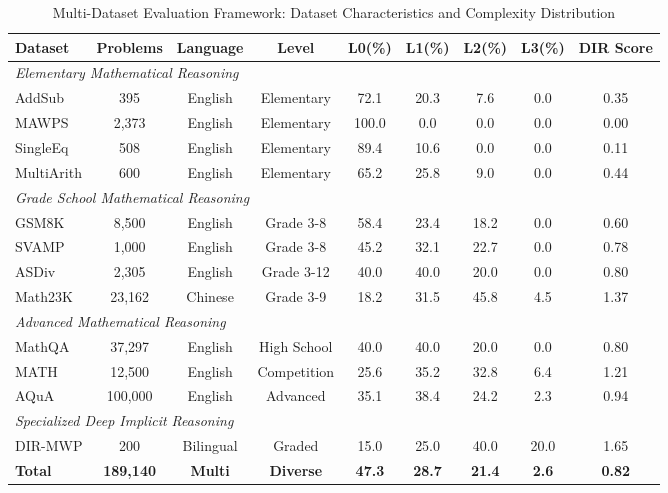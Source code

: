 \begin{table*}[htbp]
\caption{Multi-Dataset Evaluation Framework: Dataset Characteristics and Complexity Distribution}
\label{tab:dataset_framework}
\centering
\small
\begin{tabular}{lcccccccc}
\toprule
\textbf{Dataset} & \textbf{Problems} & \textbf{Language} & \textbf{Level} & \textbf{L0(\%)} & \textbf{L1(\%)} & \textbf{L2(\%)} & \textbf{L3(\%)} & \textbf{DIR Score} \\
\midrule
\multicolumn{9}{l}{\textit{Elementary Mathematical Reasoning}} \\
AddSub & 395 & English & Elementary & 72.1 & 20.3 & 7.6 & 0.0 & 0.35 \\
MAWPS & 2,373 & English & Elementary & 100.0 & 0.0 & 0.0 & 0.0 & 0.00 \\
SingleEq & 508 & English & Elementary & 89.4 & 10.6 & 0.0 & 0.0 & 0.11 \\
MultiArith & 600 & English & Elementary & 65.2 & 25.8 & 9.0 & 0.0 & 0.44 \\
\midrule
\multicolumn{9}{l}{\textit{Grade School Mathematical Reasoning}} \\
GSM8K & 8,500 & English & Grade 3-8 & 58.4 & 23.4 & 18.2 & 0.0 & 0.60 \\
SVAMP & 1,000 & English & Grade 3-8 & 45.2 & 32.1 & 22.7 & 0.0 & 0.78 \\
ASDiv & 2,305 & English & Grade 3-12 & 40.0 & 40.0 & 20.0 & 0.0 & 0.80 \\
Math23K & 23,162 & Chinese & Grade 3-9 & 18.2 & 31.5 & 45.8 & 4.5 & 1.37 \\
\midrule
\multicolumn{9}{l}{\textit{Advanced Mathematical Reasoning}} \\
MathQA & 37,297 & English & High School & 40.0 & 40.0 & 20.0 & 0.0 & 0.80 \\
MATH & 12,500 & English & Competition & 25.6 & 35.2 & 32.8 & 6.4 & 1.21 \\
AQuA & 100,000 & English & Advanced & 35.1 & 38.4 & 24.2 & 2.3 & 0.94 \\
\midrule
\multicolumn{9}{l}{\textit{Specialized Deep Implicit Reasoning}} \\
DIR-MWP & 200 & Bilingual & Graded & 15.0 & 25.0 & 40.0 & 20.0 & 1.65 \\
\midrule
\textbf{Total} & \textbf{189,140} & \textbf{Multi} & \textbf{Diverse} & \textbf{47.3} & \textbf{28.7} & \textbf{21.4} & \textbf{2.6} & \textbf{0.82} \\
\bottomrule
\end{tabular}
\end{table*}

